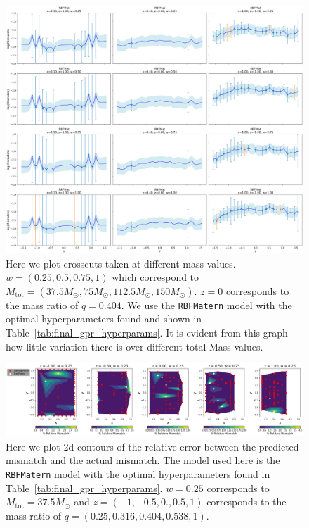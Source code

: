 \documentclass{ucdgradtaughtthesis}
\begin{document}
\begin{figure}[H]
    \centering
    \includegraphics[width=\textwidth]{LatexPlots/final_gps_plots/change_over_masses.png}
    \caption[Comparing crosscuts over different total mass values]{Here we plot crosscuts taken at different mass values. \(w = (0.25,0.5,0.75,1)\) which correspond to \(M_{\text{tot}} = (37.5 M_\odot,75 M_\odot, 112.5 M_\odot, 150 M_\odot)\). \(z = 0\) corresponds to the mass ratio of \(q = 0.404\).
     We use the \texttt{RBFMatern} model with the optimal hyperparameters found and shown in Table~\ref{tab:final_gpr_hyperparams}. It is evident from this graph
     how little variation there is over different total Mass values.}
    \label{fig:visualising_changemasses}
\end{figure}

\begin{figure}[H]
    \centering
    \includegraphics[width = \textwidth]{LatexPlots/final_gps_plots/Relative_mismatch.png}
    \caption[Relative Error 2d contour plot]{Here we plot 2d contours of the relative error between the predicted mismatch and the actual mismatch.
    The model used here is the \texttt{RBFMatern} model with the optimal hyperparameters found in Table~\ref{tab:final_gpr_hyperparams}. \(w=0.25\) corresponds to \(M_{\text{tot}} = 37.5 M_ \odot\)
    and \(z = (-1,-0.5,0.,0.5,1)\) corresponds to the mass ratio of \(q = (0.25,0.316,0.404,0.538,1)\).}
    \label{fig:Visualising_rel_error}
\end{figure}
\end{document}

